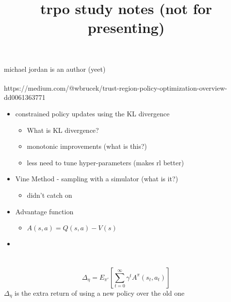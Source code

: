 \documentclass{article}
\title{trpo study notes (not for presenting)}
\begin{document}
\paragraph{} michael jordan is an author (yeet)

\paragraph{} https://medium.com/@wbrucek/trust-region-policy-optimization-overview-dd0061363771

\begin{itemize}
    \item constrained policy updates using the KL divergence
    \begin{itemize}
        \item What is KL divergence?
        \item monotonic improvements (what is this?)
        \item less need to tune hyper-parameters (makes rl better)
    \end{itemize}
    \item Vine Method - sampling with a simulator (what is it?)
    \begin{itemize}
        \item didn't catch on
    \end{itemize}

    \item Advantage function
    \begin{itemize}
        \item $A(s, a) = Q(s, a) - V(s)$
    \end{itemize}
    \item 
\end{itemize}
\section{}
\[ \Delta_\eta = E_{\pi'} \left[ \sum_{t=0}^\infty  \gamma^t A^\pi \left( s_t, a_t \right) \right] \]
$ \Delta_\eta $ is the extra return of using a new policy over the old one
\end{document}

